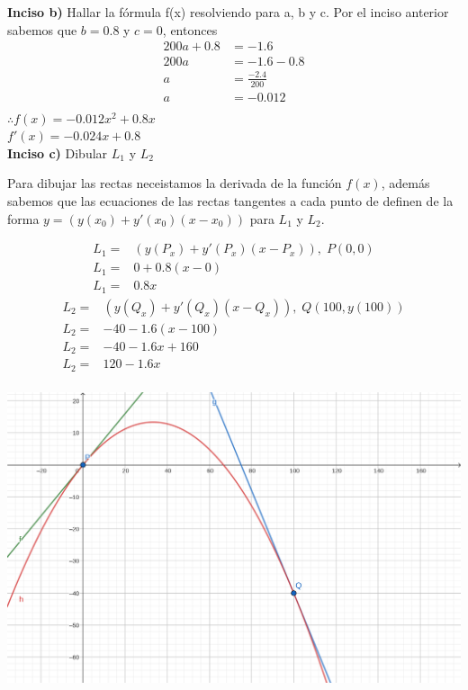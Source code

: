 \textbf{Inciso b)} Hallar la fórmula f(x) resolviendo para a, b y c.
Por el inciso anterior sabemos que $b=0.8$ y $c=0$, entonces
\begin{align*}
	200a+0.8 & =-1.6             \\
	200a     & =-1.6-0.8         \\
	a        & =\frac{-2.4}{200} \\
	a        & =-0.012           \\
\end{align*}
$\therefore f(x)=-0.012x^2+0.8x$\\
$f'(x)=-0.024x+0.8$
\vspace*{1em}
\\
\textbf{Inciso c)} Dibular $L_1$ y $L_2$

Para dibujar las rectas neceistamos la derivada de la función $f(x)$, además sabemos que las ecuaciones de las rectas tangentes a cada punto de definen de la forma $y=(y(x_0)+y'(x_0)(x-x_0))$ para $L_1$ y $L_2$.

\begin{multicols}{2}
	\noindent
	\begin{align*}
		L_1= & (y(P_x)+y'(P_x)(x-P_x)), \;P(0,0) \\
		L_1= & 0+0.8(x-0)                        \\
		L_1= & 0.8x
	\end{align*}
	\columnbreak
	\begin{align*}
		L_2= & (y(Q_x)+y'(Q_x)(x-Q_x)), \;Q(100,y(100)) \\
		L_2= & -40-1.6(x-100)                           \\
		L_2= & -40-1.6x+160                             \\
		L_2= & 120-1.6x                                 \\
	\end{align*}
\end{multicols}

\begin{center}
	\includegraphics[height = 0.3\textheight]{recursos/geogebra-export.png}\par
\end{center}

